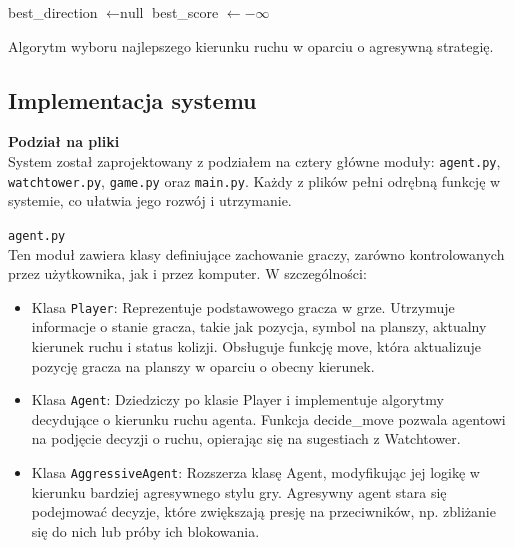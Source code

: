 \documentclass[12pt,a4paper]{article}
\begin{document}
\begin{algorithm}[H]

best\_direction $\gets \text{null}$\;
best\_score $\gets -\infty$\;


\;

\caption{Algorytm wyboru najlepszego kierunku ruchu w oparciu o agresywną strategię.}
\end{algorithm}

	\subsection*{Implementacja systemu}
	
    \textbf{Podział na pliki}\\
System został zaprojektowany z podziałem na cztery główne moduły: \verb|agent.py|, \verb|watchtower.py|, \verb|game.py| oraz \verb|main.py|. Każdy z plików pełni odrębną funkcję w systemie, co ułatwia jego rozwój i utrzymanie.
\bigskip

\verb|agent.py|\\
Ten moduł zawiera klasy definiujące zachowanie graczy, zarówno kontrolowanych przez użytkownika, jak i przez komputer. W szczególności:
\begin{itemize}
    \item Klasa \verb|Player|:
    Reprezentuje podstawowego gracza w grze.
    Utrzymuje informacje o stanie gracza, takie jak pozycja, symbol na planszy, aktualny kierunek ruchu i status kolizji.
    Obsługuje funkcję move, która aktualizuje pozycję gracza na planszy w oparciu o obecny kierunek.
    
    \item Klasa \verb|Agent|:
    Dziedziczy po klasie Player i implementuje algorytmy decydujące o kierunku ruchu agenta.
    Funkcja decide\_move pozwala agentowi na podjęcie decyzji o ruchu, opierając się na sugestiach z Watchtower.

    \item Klasa \verb|AggressiveAgent|:
    Rozszerza klasę Agent, modyfikując jej logikę w kierunku bardziej agresywnego stylu gry.
    Agresywny agent stara się podejmować decyzje, które zwiększają presję na przeciwników, np. zbliżanie się do nich lub próby ich blokowania.
\end{itemize}
\bigskip
\end{document}
